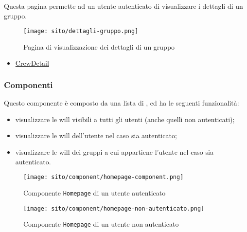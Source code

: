 Questa pagina permette ad un utente autenticato di visualizzare i dettagli di un gruppo. 
\begin{figure}[H] 
    \centerline{\texttt{[image: sito/dettagli-gruppo.png]}} 
    \caption{Pagina di visualizzazione dei dettagli di un gruppo}
\end{figure}
\begin{itemize}
    \item \hyperref[par:CrewDetail]{CrewDetail}
\end{itemize}

\subsubsection{Componenti}
\label{par:HomepageComponent}
Questo componente è composto da una lista di , ed ha le seguenti funzionalità: 
\begin{itemize}
    \item visualizzare le \gls{will} visibili a tutti gli utenti (anche quelli non autenticati);
    \item visualizzare le \gls{will} dell'utente nel caso sia autenticato;
    \item visualizzare le \gls{will} dei gruppi a cui appartiene l'utente nel caso sia autenticato.
\end{itemize}

\begin{figure}[H] 
    \centerline{\texttt{[image: sito/component/homepage-component.png]}}
    \caption{Componente \texttt{Homepage} di un utente autenticato}
\end{figure}

\begin{figure}[H] 
    \centerline{\texttt{[image: sito/component/homepage-non-autenticato.png]}}
    \caption{Componente \texttt{Homepage} di un utente non autenticato}
\end{figure}


